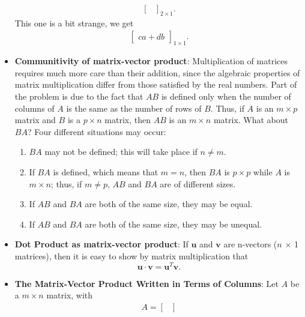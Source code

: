 \documentclass{report}
\begin{document}
\begin{itemize}
\begin{align*}
\begin{bmatrix}
                    \end{bmatrix}_{2\times 1}
                .\end{align*}
                This one is a bit strange, we get
                \begin{align*}
                    \begin{bmatrix}
                        ca + db
                    \end{bmatrix}_{1\times1}
                .\end{align*}
            \item \textbf{Communitivity of matrix-vector product}:
                 Multiplication of matrices requires much more care than their addition, since the algebraic properties of matrix multiplication differ from those satisfied by the real numbers. Part of the problem is due to the fact that \(AB\) is defined only when the number of columns of \(A\) is the same as the number of rows of \(B\). Thus, if \(A\) is an \(m \times p\) matrix and \(B\) is a \(p \times n\) matrix, then \(AB\) is an \(m \times n\) matrix. What about \(BA\)? Four different situations may occur:
                \begin{enumerate}
                    \item \(BA\) may not be defined; this will take place if \(n \neq m\).
                    \item If \(BA\) is defined, which means that \(m = n\), then \(BA\) is \(p \times p\) while \(A\) is \(m \times n\); thus, if \(m \neq p\), \(AB\) and \(BA\) are of different sizes.
                    \item If \(AB\) and \(BA\) are both of the same size, they may be equal.
                    \item If \(AB\) and \(BA\) are both of the same size, they may be unequal.
                \end{enumerate}
            \item \textbf{Dot Product as matrix-vector product}:
                If $\mathbf{u}$ and $\mathbf{v}$ are n-vectors ($n$ $\times$ 1 matrices), then it is easy to show by matrix multiplication that
                \[
                    \mathbf{u} \cdot \mathbf{v} = \mathbf{u}^T \mathbf{v}.
                \]
            \item \textbf{The Matrix-Vector Product Written in Terms of Columns}:
                Let $A$ be a $m\times n$ matrix, with
                \begin{align*}
                    A = 
                    \begin{bmatrix}

\end{bmatrix}
\end{align*}
\end{itemize}
\end{document}
